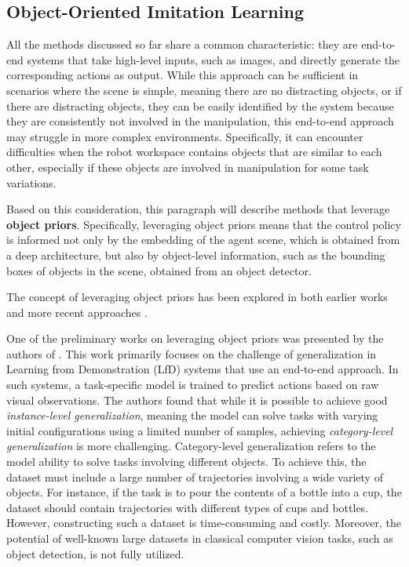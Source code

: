\subsection{Object-Oriented Imitation Learning}
\label{sec:ooil}
All the methods discussed so far share a common characteristic: they are end-to-end systems that take high-level inputs, such as images, and directly generate the corresponding actions as output. While this approach can be sufficient in scenarios where the scene is simple, meaning there are no distracting objects, or if there are distracting objects, they can be easily identified by the system because they are consistently not involved in the manipulation, this end-to-end approach may struggle in more complex environments. Specifically, it can encounter difficulties when the robot workspace contains objects that are similar to each other, especially if these objects are involved in manipulation for some task variations.

Based on this consideration, this paragraph will describe methods that leverage \textbf{object priors}. Specifically, leveraging object priors means that the control policy is informed not only by the embedding of the agent scene, which is obtained from a deep architecture, but also by object-level information, such as the bounding boxes of objects in the scene, obtained from an object detector.

The concept of leveraging object priors has been explored in both earlier works \cite{devin2018deep,park2021object} and more recent approaches \cite{belkhale2023plato,zhu2023viola,zhu2023learning,jiang2023vima}.

One of the preliminary works on leveraging object priors was presented by the authors of \cite{devin2018deep}. This work primarily focuses on the challenge of generalization in Learning from Demonstration (LfD) systems that use an end-to-end approach. In such systems, a task-specific model is trained to predict actions based on raw visual observations. The authors found that while it is possible to achieve good \textit{instance-level generalization}, meaning the model can solve tasks with varying initial configurations using a limited number of samples, achieving \textit{category-level generalization} is more challenging. Category-level generalization refers to the model ability to solve tasks involving different objects. To achieve this, the dataset must include a large number of trajectories involving a wide variety of objects. For instance, if the task is to pour the contents of a bottle into a cup, the dataset should contain trajectories with different types of cups and bottles. However, constructing such a dataset is time-consuming and costly. Moreover, the potential of well-known large datasets in classical computer vision tasks, such as object detection, is not fully utilized.

